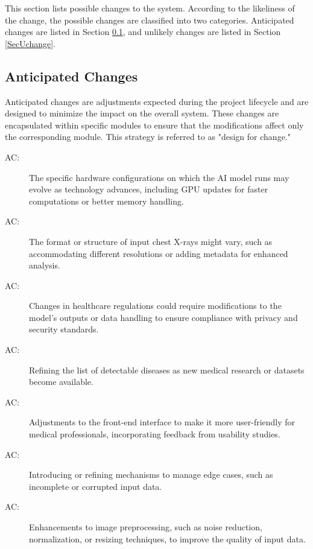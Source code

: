\documentclass[12pt, titlepage]{article}
\newcounter{acnum}
\newcommand{\actheacnum}{AC\theacnum}
\begin{document}
This section lists possible changes to the system. According to the likeliness
of the change, the possible changes are classified into two
categories. Anticipated changes are listed in Section \ref{SecAchange}, and
unlikely changes are listed in Section \ref{SecUchange}.

\subsection{Anticipated Changes} \label{SecAchange}

Anticipated changes are adjustments expected during the project lifecycle and are designed to minimize the impact on the overall system. These changes are encapsulated within specific modules to ensure that the modifications affect only the corresponding module. This strategy is referred to as "design for change."

\begin{description}
\item[ \actheacnum \label{acHardware}:] The specific hardware configurations on which the AI model runs may evolve as technology advances, including GPU updates for faster computations or better memory handling.

\item[ \actheacnum \label{acInput}:] The format or structure of input chest X-rays might vary, such as accommodating different resolutions or adding metadata for enhanced analysis.

\item[ \actheacnum \label{acCompliance}:] Changes in healthcare regulations could require modifications to the model’s outputs or data handling to ensure compliance with privacy and security standards.

\item[ \actheacnum \label{acDisease}:] Refining the list of detectable diseases as new medical research or datasets become available.

\item[ \actheacnum \label{acUI}:] Adjustments to the front-end interface to make it more user-friendly for medical professionals, incorporating feedback from usability studies.

\item[ \actheacnum \label{acErrorHandling}:] Introducing or refining mechanisms to manage edge cases, such as incomplete or corrupted input data.

\item[ \actheacnum \label{acPreprocessing}:] Enhancements to image preprocessing, such as noise reduction, normalization, or resizing techniques, to improve the quality of input data.

\end{description}
\end{document}
